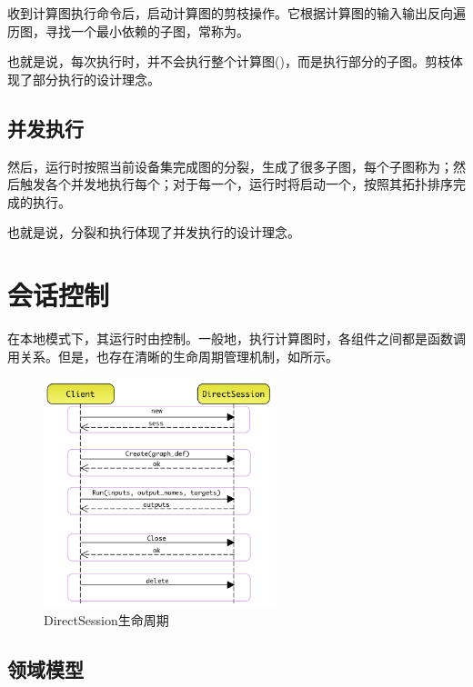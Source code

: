\begin{content}
收到计算图执行命令后，启动计算图的剪枝操作。它根据计算图的输入输出反向遍历图，寻找一个最小依赖的子图，常称为。

也就是说，每次执行时，并不会执行整个计算图()，而是执行部分的子图。剪枝体现了\tf{}部分执行的设计理念。

\subsection{并发执行}

然后，运行时按照当前设备集完成图的分裂，生成了很多子图，每个子图称为；然后触发各个并发地执行每个；对于每一个，运行时将启动一个，按照其拓扑排序完成的执行。

也就是说，分裂和执行体现了\tf{}并发执行的设计理念。

\section{会话控制}

在本地模式下，其运行时由控制。一般地，执行计算图时，各组件之间都是函数调用关系。但是，也存在清晰的生命周期管理机制，如所示。

\begin{figure}[H]
\centering
\includegraphics[width=0.6\textwidth]{figures/local-direct-session-lifecycle.png}
\caption{DirectSession生命周期}
 \label{fig:local-direct-session-lifecycle}
\end{figure}

\subsection{领域模型}


\end{content}
